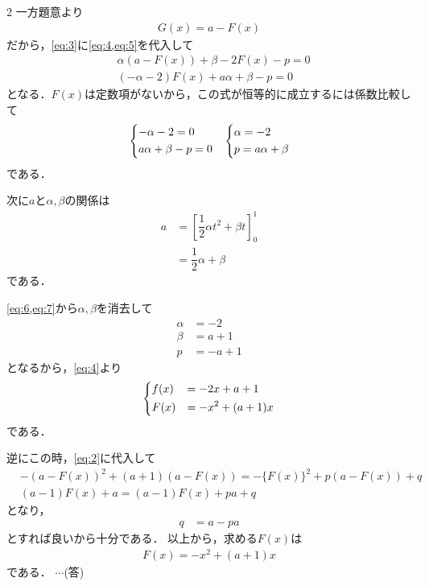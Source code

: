 \documentclass[../../main.tex]{subfiles}
\begin{document}
\begin{multicols}{2}
  一方題意より
  \begin{align}
    G(x) = a - F(x) \label{eq:5}
  \end{align}
  だから，\cref{eq:3}に\cref{eq:4,eq:5}を代入して
  \begin{align}
    & \alpha (a-F(x)) + \beta - 2F(x) - p = 0    \\
    & (-\alpha-2)F(x) + a\alpha + \beta  - p = 0
  \end{align}
  となる．$F(x)$は定数項がないから，この式が恒等的に成立するには係数比較して
  \begin{align}
    &
    \begin{dcases}
      -\alpha-2 = 0 \\
      a\alpha + \beta  - p = 0
    \end{dcases}
    &
    \begin{dcases}
      \alpha = -2 \\
      p = a\alpha + \beta
    \end{dcases} \label{eq:6}
  \end{align}
  である．

  次に$a$と$\alpha,\beta$の関係は
  \begin{align}
    a
    & = \left[ \dfrac{1}{2}\alpha t^2 + \beta t \right]_0^1 \\
    & = \dfrac{1}{2}\alpha + \beta \label{eq:7}
  \end{align}
  である．

  \cref{eq:6,eq:7}から$\alpha,\beta$を消去して
  \begin{align}
    \alpha & = -2     \\
    \beta  & = a +1   \\
    p      & = -a + 1
  \end{align}
  となるから，\cref{eq:4}より
  \begin{align}
    \begin{dcases}
      f(x) & = -2x + a+1     \\
      F(x) & =-x^2 + (a+1)x
    \end{dcases}\label{eq:8}
  \end{align}
  である．

  逆にこの時，\cref{eq:2}に代入して
  \begin{align}
    & -(a-F(x))^2 + (a+1)(a-F(x)) = -\{F(x)\}^2 + p(a-F(x)) + q \\
    & (a-1)F(x) + a = (a-1)F(x) + pa + q
  \end{align}
  となり，
  \begin{align}
    q
    & = a-pa
  \end{align}
  とすれば良いから十分である．
  以上から，求める$F(x)$は
  \begin{align}
    F(x) = -x^2 + (a+1)x
  \end{align}
  である．  $\cdots$(答)


\end{multicols}
\end{document}
